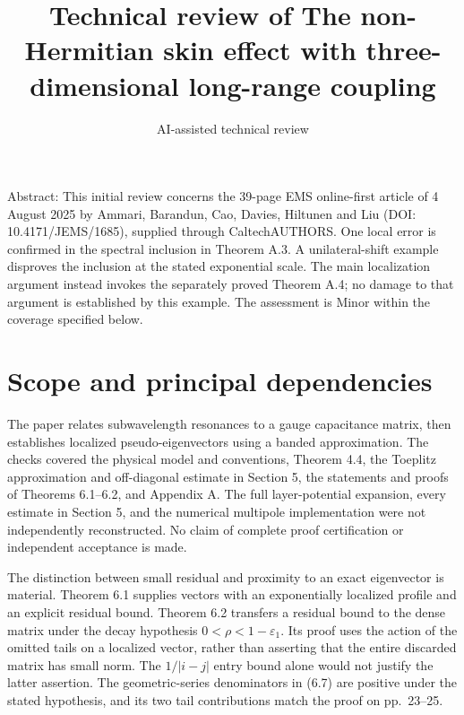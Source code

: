 \documentclass[10pt]{article}
\title{Technical review of
The non-Hermitian skin effect with three-dimensional long-range coupling}
\author{AI-assisted technical review}
\date{}
\begin{document}
\maketitle
Abstract: This initial review concerns the 39-page EMS online-first article of 4 August 2025 by Ammari, Barandun, Cao, Davies, Hiltunen and Liu (DOI: 10.4171/JEMS/1685), supplied through CaltechAUTHORS. One local error is confirmed in the spectral inclusion in Theorem A.3. A unilateral-shift example disproves the inclusion at the stated exponential scale. The main localization argument instead invokes the separately proved Theorem A.4; no damage to that argument is established by this example. The assessment is Minor within the coverage specified below.\par
\section*{Scope and principal dependencies}
The paper relates subwavelength resonances to a gauge capacitance matrix, then establishes localized pseudo-eigenvectors using a banded approximation. The checks covered the physical model and conventions, Theorem 4.4, the Toeplitz approximation and off-diagonal estimate in Section 5, the statements and proofs of Theorems 6.1–6.2, and Appendix A. The full layer-potential expansion, every estimate in Section 5, and the numerical multipole implementation were not independently reconstructed. No claim of complete proof certification or independent acceptance is made.\par
The distinction between small residual and proximity to an exact eigenvector is material. Theorem 6.1 supplies vectors with an exponentially localized profile and an explicit residual bound. Theorem 6.2 transfers a residual bound to the dense matrix under the decay hypothesis \(0<\rho<1-\varepsilon _1\). Its proof uses the action of the omitted tails on a localized vector, rather than asserting that the entire discarded matrix has small norm. The \(1/|i-j|\) entry bound alone would not justify the latter assertion. The geometric-series denominators in (6.7) are positive under the stated hypothesis, and its two tail contributions match the proof on pp. 23–25.\par
\end{document}
